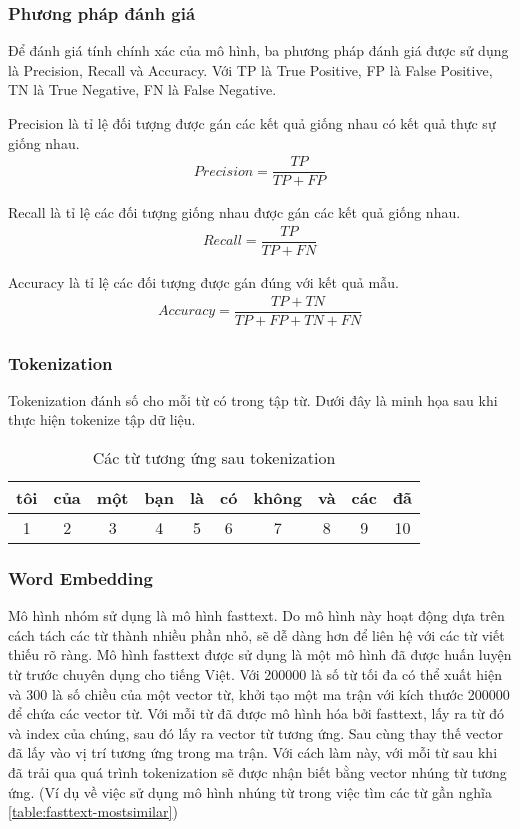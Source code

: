 \subsubsection{Phương pháp đánh giá}
Để đánh giá tính chính xác của mô hình, ba phương pháp đánh giá được sử dụng là Precision, Recall và Accuracy. Với TP là True Positive, FP là False Positive, TN là True Negative, FN là False Negative.

Precision là tỉ lệ đối tượng được gán các kết quả giống nhau có kết quả thực sự giống nhau.
\begin{align}
    Precision=\dfrac{TP}{TP+FP}
\end{align}

Recall là tỉ lệ các đối tượng giống nhau được gán các kết quả giống nhau.
\begin{align}
    Recall=\dfrac{TP}{TP+FN}
\end{align}

Accuracy là tỉ lệ các đối tượng được gán đúng với kết quả mẫu.
\begin{align}
    Accuracy=\dfrac{TP+TN}{TP+FP+TN+FN}
\end{align}

\subsubsection{Tokenization}
Tokenization đánh số cho mỗi từ có trong tập từ. Dưới đây là minh họa sau khi thực hiện tokenize
tập dữ liệu.
\begin{table}[htb]
    \centering
    \caption{Các từ tương ứng sau tokenization}
    \begin{tabularx}{0.95\textwidth}{C{1}|C{1}|C{1}|C{1}|C{1}|C{1}|C{1}|C{1}|C{1}|C{1}}
        \toprule
        tôi & của & một & bạn & là & có & không & và & các & đã \\   & 2   & 3   & 4   & 5  & 6  & 7     & 8  & 9   & 10 \\
        \bottomrule
    \end{tabularx}
\end{table}

\subsubsection{Word Embedding}
Mô hình nhóm sử dụng là mô hình fasttext. Do mô hình này hoạt động dựa trên cách tách các từ thành nhiều phần nhỏ, sẽ dễ dàng hơn để liên hệ với các từ viết thiếu rõ ràng. Mô hình fasttext được sử dụng là một mô hình đã được huấn luyện từ trước chuyên dụng cho tiếng Việt. Với 200000 là số từ tối đa có thể xuất hiện và 300 là số chiều của một vector từ, khởi tạo một ma trận với kích thước 200000 để chứa các vector từ. Với mỗi từ đã được mô hình hóa bởi fasttext, lấy ra từ đó và index của chúng, sau đó lấy ra vector từ tương ứng. Sau cùng thay thế vector đã lấy vào vị trí tương ứng trong ma trận. Với cách làm này, với mỗi từ sau khi đã trải qua quá trình tokenization sẽ được nhận biết bằng vector nhúng từ tương ứng. (Ví dụ về việc sử dụng mô hình nhúng từ trong việc tìm các từ gần nghĩa \ref{table:fasttext-mostsimilar})